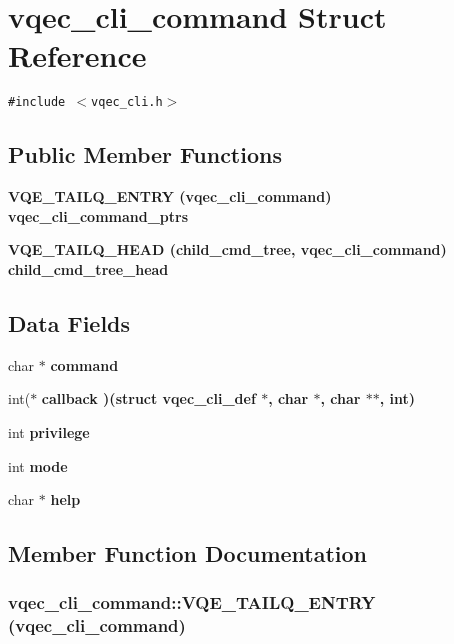 \section{vqec\_\-cli\_\-command Struct Reference}
\label{structvqec__cli__command}
{\tt \#include $<$vqec\_\-cli.h$>$}

\subsection*{Public Member Functions}
\begin{CompactItemize}
\item 
\bf{VQE\_\-TAILQ\_\-ENTRY} (\bf{vqec\_\-cli\_\-command}) vqec\_\-cli\_\-command\_\-ptrs
\item 
\bf{VQE\_\-TAILQ\_\-HEAD} (child\_\-cmd\_\-tree, \bf{vqec\_\-cli\_\-command}) child\_\-cmd\_\-tree\_\-head
\end{CompactItemize}
\subsection*{Data Fields}
\begin{CompactItemize}
\item 
char $\ast$ \bf{command}
\item 
int($\ast$ \bf{callback} )(struct \bf{vqec\_\-cli\_\-def} $\ast$, char $\ast$, char $\ast$$\ast$, int)
\item 
int \bf{privilege}
\item 
int \bf{mode}
\item 
char $\ast$ \bf{help}
\end{CompactItemize}


\subsection{Member Function Documentation}
\subsubsection{\setlength{\rightskip}{0pt plus 5cm}vqec\_\-cli\_\-command::VQE\_\-TAILQ\_\-ENTRY (\bf{vqec\_\-cli\_\-command})}\label{structvqec__cli__command_f50dea685511f7a032d22855ea1a2742}


